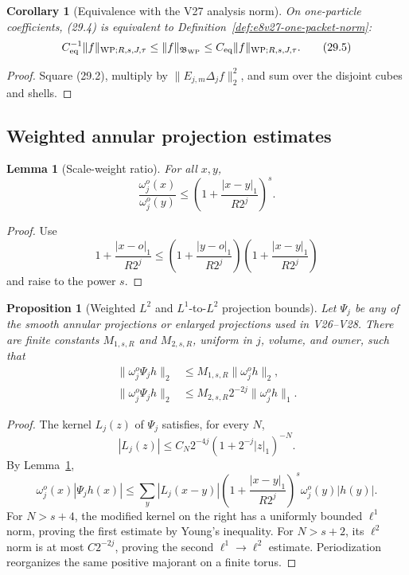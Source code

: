 \documentclass[11pt,oneside]{book}
\newtheorem{lemma}[theorem]{Lemma}
\newtheorem{proposition}[theorem]{Proposition}
\newtheorem{corollary}[theorem]{Corollary}
\theoremstyle{definition}
\theoremstyle{remark}
\begin{document}
\begin{corollary}[Equivalence with the V27 analysis norm]
\label{cor:e8v29-norm-equivalence}
On one-particle coefficients, (29.4) is equivalent to
Definition~\ref{def:e8v27-one-packet-norm}:
\[
 C_{\rm eq}^{-1}\|f\|_{{\rm WP};R,s,J,\tau}
 \leq\|f\|_{\mathfrak B_{\rm WP}}
 \leq C_{\rm eq}\|f\|_{{\rm WP};R,s,J,\tau}.                     \tag{29.5}
\]
\end{corollary}

\begin{proof}
Square (29.2), multiply by
\(\|E_{j,m}\Delta_jf\|_2^2\), and sum over the disjoint cubes and
shells.
\end{proof}

\subsection{Weighted annular projection estimates}

\begin{lemma}[Scale-weight ratio]
\label{lem:e8v29-scale-ratio}
For all \(x,y\),
\[
 \frac{\omega_j^o(x)}{\omega_j^o(y)}
 \leq
 \left(1+\frac{|x-y|_1}{R2^j}\right)^s.                           \tag{29.6}
\]
\end{lemma}

\begin{proof}
Use
\[
 1+\frac{|x-o|_1}{R2^j}
 \leq
 \left(1+\frac{|y-o|_1}{R2^j}\right)
 \left(1+\frac{|x-y|_1}{R2^j}\right)
\]
and raise to the power \(s\).
\end{proof}

\begin{proposition}[Weighted \(L^2\) and \(L^1\)-to-\(L^2\)
projection bounds]
\label{prop:e8v29-weighted-projection}
Let \(\Psi_j\) be any of the smooth annular projections or enlarged
projections used in V26--V28.  There are finite constants
\(M_{1,s,R}\) and \(M_{2,s,R}\), uniform in \(j\), volume, and owner,
such that
\[
\begin{split}
 \|\omega_j^o\Psi_jh\|_2
 &\leq M_{1,s,R}\|\omega_j^oh\|_2,\\
 \|\omega_j^o\Psi_jh\|_2
 &\leq M_{2,s,R}2^{-2j}\|\omega_j^oh\|_1.                        \tag{29.7}
\end{split}
\]
\end{proposition}

\begin{proof}
The kernel \(L_j(z)\) of \(\Psi_j\) satisfies, for every \(N\),
\[
 |L_j(z)|\leq C_N2^{-4j}
              (1+2^{-j}|z|_1)^{-N}.                             \tag{29.8}
\]
By Lemma~\ref{lem:e8v29-scale-ratio},
\[
 \omega_j^o(x)|\Psi_jh(x)|
 \leq
 \sum_y |L_j(x-y)|
 \left(1+\frac{|x-y|_1}{R2^j}\right)^s
 \omega_j^o(y)|h(y)|.                                           \tag{29.9}
\]
For \(N>s+4\), the modified kernel on the right has a uniformly
bounded \(\ell^1\) norm, proving the first estimate by Young's
inequality.  For \(N>s+2\), its \(\ell^2\) norm is at most
\(C2^{-2j}\), proving the second
\(\ell^1\to\ell^2\) estimate.  Periodization reorganizes the same
positive majorant on a finite torus.
\end{proof}
\end{document}
